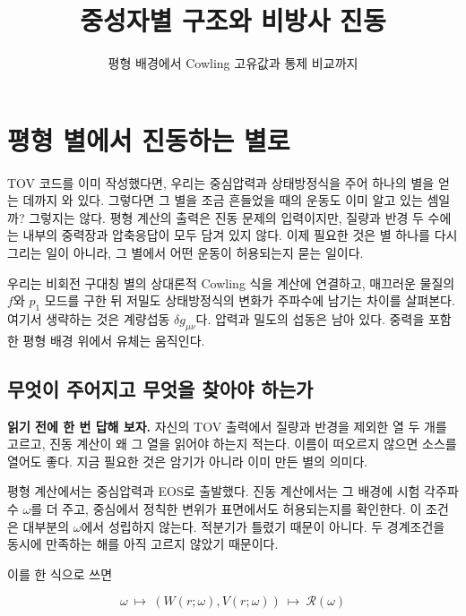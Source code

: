 \documentclass[
  10pt,
  a4paper,
]{article}
\title{중성자별 구조와 비방사 진동}
\subtitle{평형 배경에서 Cowling 고유값과 통제 비교까지}
\author{}
\date{}
\begin{document}
\maketitle

{
\hypersetup{linkcolor=}
\setcounter{tocdepth}{3}
\tableofcontents
}
\clearpage

\section{평형 별에서 진동하는
별로}\label{uxd3c9uxd615-uxbcc4uxc5d0uxc11c-uxc9c4uxb3d9uxd558uxb294-uxbcc4uxb85c}

TOV 코드를 이미 작성했다면, 우리는 중심압력과 상태방정식을 주어 하나의
별을 얻는 데까지 와 있다. 그렇다면 그 별을 조금 흔들었을 때의 운동도
이미 알고 있는 셈일까? 그렇지는 않다. 평형 계산의 출력은 진동 문제의
입력이지만, 질량과 반경 두 수에는 내부의 중력장과 압축응답이 모두 담겨
있지 않다. 이제 필요한 것은 별 하나를 다시 그리는 일이 아니라, 그 별에서
어떤 운동이 허용되는지 묻는 일이다.

우리는 비회전 구대칭 별의 상대론적 Cowling 식을 계산에 연결하고,
매끄러운 물질의 \(f\)와 \(p_1\) 모드를 구한 뒤 저밀도 상태방정식의
변화가 주파수에 남기는 차이를 살펴본다. 여기서 생략하는 것은 계량섭동
\(\delta g_{\mu\nu}\)다. 압력과 밀도의 섭동은 남아 있다. 중력을 포함한
평형 배경 위에서 유체는 움직인다.

\subsection{무엇이 주어지고 무엇을 찾아야
하는가}\label{uxbb34uxc5c7uxc774-uxc8fcuxc5b4uxc9c0uxace0-uxbb34uxc5c7uxc744-uxcc3euxc544uxc57c-uxd558uxb294uxac00}

\textbf{읽기 전에 한 번 답해 보자.} 자신의 TOV 출력에서 질량과 반경을
제외한 열 두 개를 고르고, 진동 계산이 왜 그 열을 읽어야 하는지 적는다.
이름이 떠오르지 않으면 소스를 열어도 좋다. 지금 필요한 것은 암기가
아니라 이미 만든 별의 의미다.

평형 계산에서는 중심압력과 EOS로 출발했다. 진동 계산에서는 그 배경에
시험 각주파수 \(\omega\)를 더 주고, 중심에서 정칙한 변위가 표면에서도
허용되는지를 확인한다. 이 조건은 대부분의 \(\omega\)에서 성립하지
않는다. 적분기가 틀렸기 때문이 아니다. 두 경계조건을 동시에 만족하는
해를 아직 고르지 않았기 때문이다.

이를 한 식으로 쓰면

\[
\omega\ \longmapsto\ (W(r;\omega),V(r;\omega))
\ \longmapsto\ \mathcal R(\omega)
\]
\end{document}
